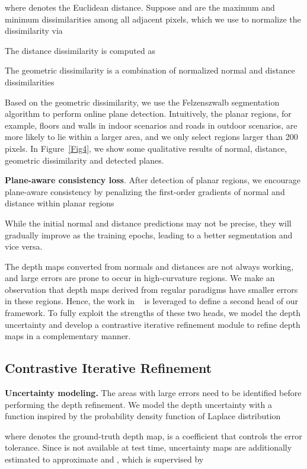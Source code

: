 \documentclass[10pt,twocolumn,letterpaper]{article}
\begin{document}
where  denotes the Euclidean distance. Suppose  and  are the maximum and minimum dissimilarities among all adjacent pixels, which we use to normalize the dissimilarity via

The distance dissimilarity is computed as 

The geometric dissimilarity is a combination of normalized normal and distance dissimilarities


Based on the geometric dissimilarity, we use the Felzenszwalb segmentation algorithm to perform online plane detection. Intuitively, the planar regions, for example, floors and walls in indoor scenarios and roads in outdoor scenarios, are more likely to lie within a larger area, and we only select regions larger than 200 pixels. In Figure~\ref{Fig4}, we show some qualitative results of normal, distance, geometric dissimilarity and detected planes. 

\textbf{Plane-aware consistency loss}. After detection of planar regions, we encourage plane-aware consistency by penalizing the first-order gradients of normal and distance within planar regions 

While the initial normal and distance predictions may not be precise, they will gradually improve as the training epochs, leading to a better segmentation and vice versa. 

The depth maps converted from normals and distances are not always working, and large errors are prone to occur in high-curvature regions. We make an observation that depth maps derived from regular paradigms have smaller errors in these regions. Hence, the work in ~\cite{Yuan_2022_CVPR} is leveraged to define a second head of our framework. To fully exploit the strengths of these two heads, we model the depth uncertainty and develop a contrastive iterative refinement module to refine depth maps in a complementary manner.
\subsection{Contrastive Iterative Refinement}
\textbf{Uncertainty modeling.} The areas with large errors need to be identified before performing the depth refinement. We model the depth uncertainty with a function inspired by the probability density function of Laplace distribution~\cite{kendall2017uncertainties}

where  denotes the ground-truth depth map,  is a coefficient that controls the error tolerance. Since  is not available at test time, uncertainty maps are additionally estimated to approximate  and , which is supervised by 
\end{document}

